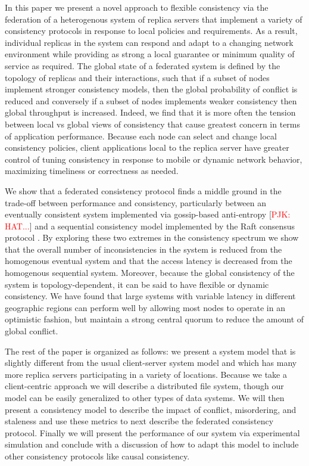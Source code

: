 \documentclass[10pt,conference,letterpaper]{IEEEtran}
\newcommand{\todo}[1]{{\textcolor{red}{#1}}}
\newcommand{\pjk}[1]{[\todo{PJK: #1}]}
\begin{document}
In this paper we present a novel approach to flexible consistency via the federation of a heterogenous system of replica servers that implement a variety of consistency protocols in response to local policies and requirements. As a result, individual replicas in the system can respond and adapt to a changing network environment while providing as strong a local guarantee or minimum quality of service as required. The global state of a federated system is defined by the topology of replicas and their interactions, such that if a subset of nodes implement stronger consistency models, then the global probability of conflict is reduced and conversely if a subset of nodes implements weaker consistency then global throughput is increased. Indeed, we find that it is more often the tension between local vs global views of consistency that cause greatest concern in terms of application performance. Because each node can select and change local consistency policies, client applications local to the replica server have greater control of tuning consistency in response to mobile or dynamic network behavior, maximizing timeliness or correctness as needed.

We show that a federated consistency protocol finds a middle ground in the trade-off between performance and consistency, particularly between an eventually consistent system implemented via gossip-based anti-entropy \cite{kempe_gossip-based_2003} \pjk{HAT...} and a sequential consistency model implemented by the Raft consensus protocol \cite{ongaro_search_2014}. By exploring these two extremes in the consistency spectrum we show that the overall number of inconsistencies in the system is reduced from the homogenous eventual system and that the access latency is decreased from the homogenous sequential system. Moreover, because the global consistency of the system is topology-dependent, it can be said to have flexible or dynamic consistency. We have found that large systems with variable latency in different geographic regions can perform well by allowing most nodes to operate in an optimistic fashion, but maintain a strong central quorum to reduce the amount of global conflict.

The rest of the paper is organized as follows: we present a system model that is slightly different from the usual client-server system model and which has many more replica servers participating in a variety of locations. Because we take a client-centric approach we will describe a distributed file system, though our model can be easily generalized to other types of data systems. We will then present a consistency model to describe the impact of conflict, misordering, and staleness and use these metrics to next describe the federated consistency protocol. Finally we will present the performance of our system via experimental simulation and conclude with a discussion of how to adapt this model to include other consistency protocols like causal consistency.
\end{document}

